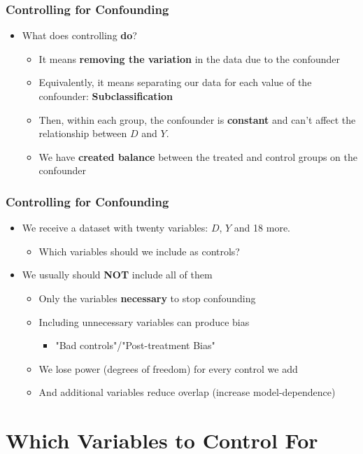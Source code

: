 \documentclass[xcolor=x11names,compress]{beamer}\usepackage[]{graphicx}\usepackage[]{color}
\renewcommand{\(}{\begin{columns}}
\renewcommand{\)}{\end{columns}}
\newcommand{\<}[1]{\begin{column}{#1}}
\renewcommand{\>}{\end{column}}
\begin{document}
\begin{frame}
\frametitle{Controlling for Confounding}
\begin{itemize}
\item What does controlling \textbf{do}?
\begin{itemize}
\pause 
\item It means \textbf{removing the variation} in the data due to the confounder
\pause
\item Equivalently, it means separating our data for each value of the confounder: \textbf{Subclassification}
\pause
\item Then, within each group, the confounder is \textbf{constant} and can't affect the relationship between $D$ and $Y$.
\pause
\item We have \textbf{created balance} between the treated and control groups on the confounder
\end{itemize}
\end{itemize}
\end{frame}

\begin{frame}
\frametitle{Controlling for Confounding}
\begin{itemize}
\item We receive a dataset with twenty variables: $D$, $Y$ and 18 more. 
\begin{itemize}
\item Which variables should we include as controls?
\end{itemize}
\pause
\item We usually should \textbf{NOT} include all of them
\pause
\begin{itemize}
\item Only the variables \textbf{necessary} to stop confounding
\pause
\item Including unnecessary variables can produce bias
\begin{itemize}
\item "Bad controls"/"Post-treatment Bias"
\end{itemize}
\pause
\item We lose power (degrees of freedom) for every control we add
\pause
\item And additional variables reduce overlap (increase model-dependence)
\pause
\end{itemize}
\end{itemize}
\end{frame}

\section{Which Variables to Control For}
\end{document}
